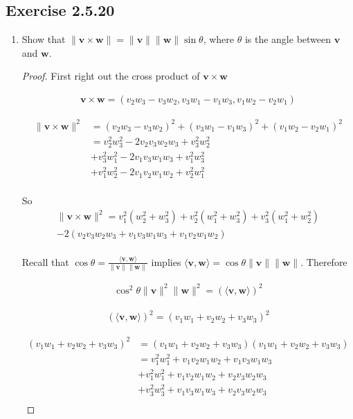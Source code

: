 \documentclass{tufte-book}
\newcommand{\vct}{\mathbf}
\newcommand{\dprod}[2]{\langle #1, #2 \rangle}
\theoremstyle{mytheoremstyle}
\theoremstyle{mylemstyle}
\theoremstyle{mydefstyle}
\begin{document}
\subsection{Exercise 2.5.20}
\begin{enumerate}
\item Show that $\|\vct{v} \times \vct{w} \| = \|\vct{v}\|\|\vct{w}\|\sin \theta$, where $\theta$ is the angle between $\vct{v}$ and $\vct{w}$.

\begin{proof}

First right out the cross product of $\vct{v} \times \vct{w}$

\begin{align}
\vct{v} \times \vct{w} = (v_2w_3 - v_3w_2, v_3w_1 - v_1w_3, v_1w_2 - v_2w_1)
\end{align}

\begin{align*}
\|\vct{v} \times \vct{w} \|^2 &= (v_2w_3 - v_3w_2)^2+(v_3w_1 - v_1w_3)^2+(v_1w_2 - v_2w_1)^2\\
&=v_2^2w_3^2 - 2v_2v_3w_2w_3 + v_3^2w_2^2 \\
&+ v_3^2w_1^2 - 2v_1v_3w_1w_3 + v_1^2w_3^2 \\
&+ v_1^2w_2^2 - 2v_1v_2w_1w_2 + v_2^2w_1^2 \\
\end{align*}

So
\begin{multline}
\|\vct{v} \times \vct{w} \|^2 = v_1^2(w_2^2 + w_3^2) + v_2^2(w_1^2+w_3^2) + v_3^2(w_1^2+w_2^2)\\
-2(v_2v_3w_2w_3 + v_1v_3w_1w_3 + v_1v_2w_1w_2)\\
\end{multline}

Recall that $\cos \theta = \frac{\dprod{\vct{v}}{\vct{w}}}{\|\vct{v}\|\|\vct{w}\|}$ implies $\dprod{\vct{v}}{\vct{w}} = \cos\theta \|\vct{v}\|\|\vct{w}\|$.  Therefore

\begin{align}
\cos^2\theta \|\vct{v}\|^2\|\vct{w}\|^2 = (\dprod{\vct{v}}{\vct{w}})^2
\end{align}

\begin{align}
(\dprod{\vct{v}}{\vct{w}})^2 = (v_1w_1 + v_2w_2 + v_3w_3)^2
\end{align}

\begin{align*}
(v_1w_1 + v_2w_2 + v_3w_3)^2 &= (v_1w_1 + v_2w_2 + v_3w_3)(v_1w_1 + v_2w_2 + v_3w_3)\\
&= v_1^2w_1^2 + v_1v_2w_1w_2 + v_1v_3w_1w_3 \\
&+ v_1^2w_1^2 + v_1v_2w_1w_2 + v_2v_3w_2w_3 \\
&+ v_3^2w_3^2 + v_1v_3w_1w_3 + v_2v_3w_2w_3 \\
\end{align*}


\end{proof}
\end{enumerate}
\end{document}
